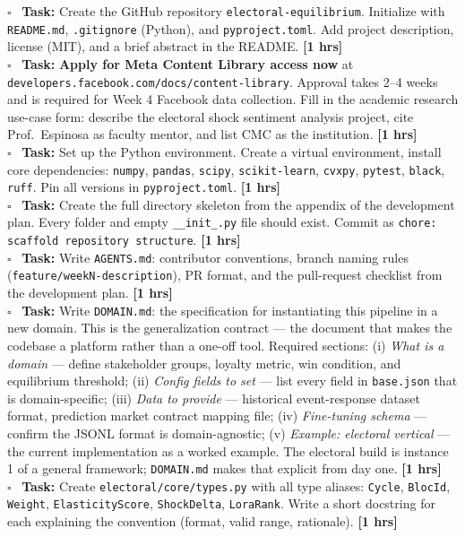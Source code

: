 \documentclass[11pt]{article}
\newcommand{\hrs}[1]{\textbf{[#1 hrs]}}
\newcommand{\task}[2]{%
  \noindent\textbf{Task:} #1 \hfill \hrs{#2}\\}
\newcommand{\done}{\textcolor{sectionblue}{$\square$}\ }
\begin{document}
\begin{taskbox}
\done \task{Create the GitHub repository \texttt{electoral-equilibrium}. Initialize
  with \texttt{README.md}, \texttt{.gitignore} (Python), and \texttt{pyproject.toml}.
  Add project description, license (MIT), and a brief abstract in the README.}{1}

\done \task{\textbf{Apply for Meta Content Library access now} at
  \texttt{developers.facebook.com/docs/content-library}. Approval takes 2--4 weeks
  and is required for Week 4 Facebook data collection. Fill in the academic research
  use-case form: describe the electoral shock sentiment analysis project, cite
  Prof.\ Espinosa as faculty mentor, and list CMC as the institution.}{1}

\done \task{Set up the Python environment. Create a virtual environment, install
  core dependencies: \texttt{numpy}, \texttt{pandas}, \texttt{scipy}, \texttt{scikit-learn},
  \texttt{cvxpy}, \texttt{pytest}, \texttt{black}, \texttt{ruff}. Pin all versions
  in \texttt{pyproject.toml}.}{1}

\done \task{Create the full directory skeleton from the appendix of the development
  plan. Every folder and empty \texttt{\_\_init\_.py} file should exist. Commit as
  \texttt{chore: scaffold repository structure}.}{1}

\done \task{Write \texttt{AGENTS.md}: contributor conventions, branch naming rules
  (\texttt{feature/weekN-description}), PR format, and the pull-request checklist
  from the development plan.}{1}

\done \task{Write \texttt{DOMAIN.md}: the specification for instantiating this
  pipeline in a new domain. This is the generalization contract --- the document
  that makes the codebase a platform rather than a one-off tool. Required sections:
  (i) \textit{What is a domain} --- define stakeholder groups, loyalty metric,
  win condition, and equilibrium threshold; (ii) \textit{Config fields to set} ---
  list every field in \texttt{base.json} that is domain-specific;
  (iii) \textit{Data to provide} --- historical event-response dataset format,
  prediction market contract mapping file; (iv) \textit{Fine-tuning schema} ---
  confirm the JSONL format is domain-agnostic; (v) \textit{Example: electoral
  vertical} --- the current implementation as a worked example.
  The electoral build is instance 1 of a general framework; \texttt{DOMAIN.md}
  makes that explicit from day one.}{1}

\done \task{Create \texttt{electoral/core/types.py} with all type aliases:
  \texttt{Cycle}, \texttt{BlocId}, \texttt{Weight}, \texttt{ElasticityScore},
  \texttt{ShockDelta}, \texttt{LoraRank}. Write a short docstring for each
  explaining the convention (format, valid range, rationale).}{1}


\end{taskbox}
\end{document}
